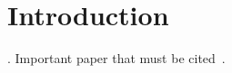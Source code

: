 \chapter{Introduction}

\lipsum[1-5]. Important paper that must be cited~\cite{landgren2021distributed}.